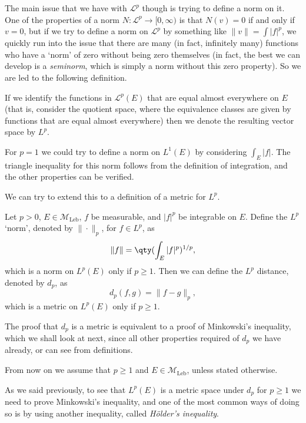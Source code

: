 \documentclass{maths}
\newcommand{\mleb}{\mathcal{M}_{\text{Leb}}}
\newcommand{\lp}{\mathcal{L}^p}
\begin{document}
The main issue that we have with $\lp$ though is trying to define a norm on it.
One of the properties of a norm $N\colon\lp\to[0,\infty)$ is that $N(v)=0$ if and only if $v=0$, but if we try to define a norm on $\lp$ by something like $\|v\| = \int |f|^p$, we quickly run into the issue that there are many (in fact, infinitely many) functions who have a `norm' of zero without being zero themselves (in fact, the best we can develop is a \emph{seminorm}, which is simply a norm without this zero property).
So we are led to the following definition.

\begin{defn}[$L^p$ spaces]
    If we identify the functions in $\lp(E)$ that are equal almost everywhere on $E$ (that is, consider the quotient space, where the equivalence classes are given by functions that are equal almost everywhere) then we denote the resulting vector space by $L^p$.
\end{defn}

For $p=1$ we could try to define a norm on $L^1(E)$ by considering $\int_E|f|$.
The triangle inequality for this norm follows from the definition of integration, and the other properties can be verified.

We can try to extend this to a definition of a metric for $L^p$.

\begin{defn}
    Let $p>0$, $E\in\mleb$, $f$ be measurable, and $|f|^p$ be integrable on $E$.
    Define the $L^p$ `norm', denoted by $\|\cdot\|_p$, for $f\in L^p$, as
    \[
        \|f\| =
        \qty(\int_E |f|^p)^{1/p},
    \]
    which is a norm on $L^p(E)$ only if $p\geqslant1$.
    Then we can define the $L^p$ distance, denoted by $d_p$, as
    \[
        d_p(f,g) =
        \|f-g\|_p,
    \]
    which is a metric on $L^p(E)$ only if $p\geqslant1$.

    The proof that $d_p$ is a metric is equivalent to a proof of Minkowski's inequality, which we shall look at next, since all other properties required of $d_p$ we have already, or can see from definitions.
\end{defn}

\begin{rem}
    From now on we assume that $p\geqslant1$ and $E\in\mleb$, unless stated otherwise.
\end{rem}

As we said previously, to see that $L^p(E)$ is a metric space under $d_p$ for $p\geqslant1$ we need to prove Minkowski's inequality, and one of the most common ways of doing so is by using another inequality, called \emph{H\"older's inequality}.
\end{document}
